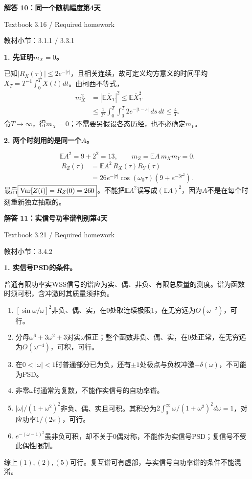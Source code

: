 \documentclass[10.5pt,fontset=fandol]{ctexart}
\newcommand{\E}{\mathbb E}\newcommand{\ee}{\mathrm e}\newcommand{\jj}{\mathrm j}
\newcommand{\qtitle}[2]{\par\addvspace{.85em}\Needspace{10\baselineskip}\begin{tcolorbox}[colback=navy,colframe=navy,arc=1.5pt,boxrule=0pt]\color{white}\large\bfseries #1\hfill\small #2\end{tcolorbox}}
\newcommand{\step}[1]{\par\addvspace{.4em}\Needspace{4\baselineskip}\textbf{#1}\par}\hypersetup{pdftitle={SSA Chapter 3 Review Solutions - Chinese}}
\begin{document}
\qtitle{解答 10：同一个随机幅度}{第4天}
{\small\color{accentred}Textbook 3.16 / Required homework}\par{\small\color{muted}教材小节：3.1.1 / 3.3.1}\par\smallskip\step{1. 先证明$m_X=0$。}
已知$|R_X(\tau)|\le2e^{-|\tau|}$，且相关连续，故可定义均方意义的时间平均$\overline X_T=T^{-1}\int_0^T X(t)dt$。由柯西不等式，
\[\begin{aligned}
m_X^2&=|\E\overline X_T|^2\le\E\overline X_T^2\\
&\le\frac1{T^2}\int_0^T\!\int_0^T2e^{-|t-s|}\,ds\,dt\le\frac4T.
\end{aligned}\]
令$T\to\infty$，得$m_X=0$；不需要另假设各态历经，也不必确定$m_Y$。
\step{2. 两个时刻用的是同一个$A$。}
\[\E A^2=9+2^2=13,\qquad \boxed{m_Z=\E A\,m_Xm_Y=0}.\]
\[\begin{aligned}R_Z(\tau)&=\E A^2\,R_X(\tau)R_Y(\tau)\\
&=\boxed{26e^{-|\tau|}\cos(\omega_0\tau)(9+e^{-3\tau^2})}.
\end{aligned}\]
最后$\boxed{\operatorname{Var}[Z(t)]=R_Z(0)=260}$。不能把$\E A^2$误写成$(\E A)^2$，因为$A$不是在每个时刻重新独立抽取的。

\qtitle{解答 11：实信号功率谱判别}{第4天}
{\small\color{accentred}Textbook 3.21 / Required homework}\par{\small\color{muted}教材小节：3.4.2}\par\smallskip\step{1. 实信号PSD的条件。}
普通有限功率实WSS信号的谱应为实、偶、非负、有限总质量的测度。谱为函数时须可积，含冲激时其质量须非负。
\begin{enumerate}
\item $[\sin\omega/\omega]^2$非负、偶、实，在0处取连续极限1，在无穷远为$O(\omega^{-2})$，可行。
\item 分母$\omega^6+3\omega^2+3$对实$\omega$恒正；整个函数非负、偶、实，在0处正常，在无穷远为$O(\omega^{-4})$，可积，可行。
\item 在$0<|\omega|<1$时普通部分已为负，还有$\pm1$处极点与负权冲激$-\delta(\omega)$，不可能为PSD。
\item 非零$\omega$时通常为复数，不能作实信号的自功率谱。
\item $|\omega|/(1+\omega^2)^2$非负、偶、实且可积。其积分为$2\int_0^\infty\omega/(1+\omega^2)^2d\omega=1$，对应功率$1/(2\pi)$，可行。
\item $e^{-(\omega-1)^2}$虽非负可积，却不关于0偶对称，不能作为实信号PSD；复信号不受此偶性限制。
\end{enumerate}
综上$\boxed{(1),(2),(5)\text{可行}}$。复互谱可有虚部，与实信号自功率谱的条件不能混淆。
\end{document}
